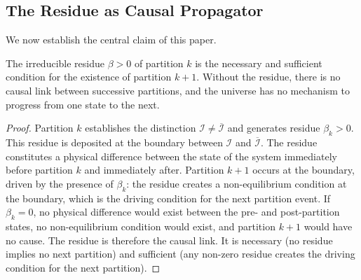 \subsection{The Residue as Causal Propagator}
\label{subsec:causal_residue}

We now establish the central claim of this paper.

\begin{theorem}
\label{thm:causal_residue}
The irreducible residue $\beta > 0$ of partition $k$ is the necessary and
sufficient condition for the existence of partition $k+1$. Without the residue,
there is no causal link between successive partitions, and the universe has no
mechanism to progress from one state to the next.
\end{theorem}

\begin{proof}
Partition $k$ establishes the distinction $\mathcal{I} \neq \overline{\mathcal{I}}$
and generates residue $\beta_k > 0$. This residue is deposited at the boundary
between $\mathcal{I}$ and $\overline{\mathcal{I}}$. The residue constitutes a
physical difference between the state of the system immediately before partition
$k$ and immediately after. Partition $k+1$ occurs at the boundary, driven by the
presence of $\beta_k$: the residue creates a non-equilibrium condition at the
boundary, which is the driving condition for the next partition event. If
$\beta_k = 0$, no physical difference would exist between the pre- and
post-partition states, no non-equilibrium condition would exist, and partition
$k+1$ would have no cause. The residue is therefore the causal link. It is
necessary (no residue implies no next partition) and sufficient (any non-zero
residue creates the driving condition for the next partition).
\end{proof}

